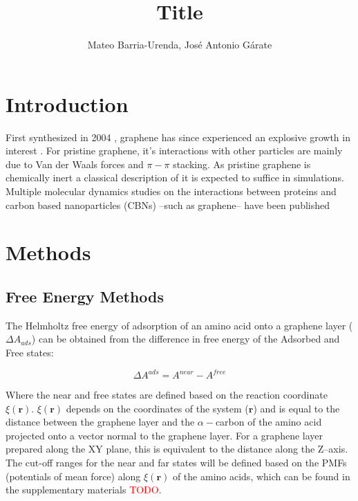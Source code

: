 \documentclass[twoside,twocolumn,9pt]{article}
\author{Mateo Barria-Urenda, José Antonio Gárate}
\title{Title}
\date{}
\begin{document}
\maketitle

\abstract{}

\section{Introduction}


First synthesized in 2004 \cite{Novoselov_2004}, graphene has since
experienced an explosive growth in interest \cite{Randviir_2014}.  For
pristine graphene, it's interactions with other particles are mainly
due to Van der Waals forces and $\pi-\pi$ stacking. \cite{Zuo_2012} As
pristine graphene is chemically inert \cite{Eftekhari_2017} a
classical description of it is expected to suffice in simulations.
Multiple molecular dynamics studies on the interactions between
proteins and carbon based nanoparticles (CBNs) --such as graphene--
have been published \cite{Zheng_2003, Ge_2011, Zuo_2012, Chong_2015,
  Duan_2015, Shityakov_2015, Al_Qattan_2018,Puigpelat_2019,
  Gonz_lez_Durruthy_2020, Li_2020}





\section{Methods}

\subsection{Free Energy Methods}

The Helmholtz free energy of adsorption of an amino acid onto a
graphene layer ($\Delta A_{ads}$) can be obtained from the difference
in free energy of the Adsorbed and Free states:

\begin{equation}
\label{eq:Adsorption}
\Delta A^{ads} = A^{near} - A^{free}
\end{equation}

Where the near and free states are defined based on the reaction
coordinate $\xi(\mathbf{r})$. $\xi(\mathbf{r})$ depends on the
coordinates of the system ($\mathbf{r}$) and is equal to the distance
between the graphene layer and the $\alpha-$carbon of the amino acid
projected onto a vector normal to the graphene layer. For a graphene
layer prepared along the XY plane, this is equivalent to the distance
along the Z--axis. The cut-off ranges for the near and far states will
be defined based on the PMFs (potentials of mean force) along $\xi(\mathbf{r})$ of
the amino acids, which can be found in the supplementary materials
\textcolor{red}{TODO}.
\end{document}
